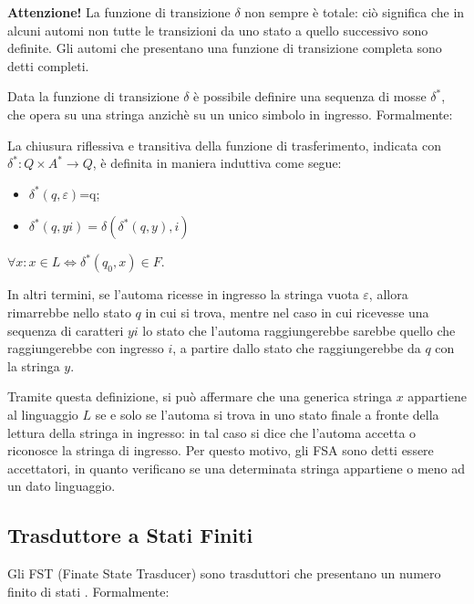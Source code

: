     \textbf{Attenzione!} La funzione di transizione \(\delta\) non sempre è totale: ciò significa che in alcuni automi non tutte le transizioni da uno stato a quello successivo sono definite. Gli automi che presentano una funzione di transizione completa sono detti completi.

    Data la funzione di transizione \(\delta\) è possibile definire una sequenza di mosse \(\delta^*\), che opera su una stringa anzichè su un unico simbolo in ingresso. Formalmente:

    \begin{definition}
      La chiusura riflessiva e transitiva della funzione di trasferimento, indicata con \(\delta^*:Q\times A^* \to Q\), è definita in maniera induttiva come segue:
      \begin{itemize}
        \item \(\delta^*(q,\varepsilon)\)=q;
        \item \(\delta^*(q,yi) = \delta(\delta^*(q,y), i)\)
      \end{itemize}
      \(\forall x : x \in L \Leftrightarrow \delta^*(q_0, x) \in F\).
    \end{definition}   

    In altri termini, se l'automa ricesse in ingresso la stringa vuota \(\varepsilon\), allora rimarrebbe nello stato \(q\) in cui si trova, mentre nel caso in cui ricevesse una sequenza di caratteri \(yi\) lo stato che l'automa raggiungerebbe sarebbe quello che raggiungerebbe con ingresso \(i\), a partire dallo stato che raggiungerebbe da \(q\) con la stringa \(y\).
    
    Tramite questa definizione, si può affermare che una generica stringa \(x\) appartiene al linguaggio \(L\) se e solo se l'automa si trova in uno stato finale a fronte della lettura della stringa in ingresso: in tal caso si dice che l'automa accetta o riconosce la stringa di ingresso. Per questo motivo, gli FSA sono detti essere accettatori, in quanto verificano se una determinata stringa appartiene o meno ad un dato linguaggio.

    \subsection{Trasduttore a Stati Finiti}
    Gli FST (Finate State Trasducer) sono trasduttori che presentano un numero finito di stati . Formalmente:

